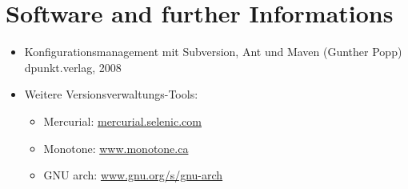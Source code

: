 \section{Software and further Informations}
\begin{itemize}
\item Konfigurationsmanagement mit Subversion,
  Ant und Maven (Gunther Popp) dpunkt.verlag, 2008
\label{lit:popp}
\item Weitere Versionsverwaltungs-Tools:
\begin{itemize}
\item Mercurial: \href{http://mercurial.selenic.com/}{mercurial.selenic.com}
\item Monotone:
  \href{http://www.monotone.ca}{www.monotone.ca}
\item GNU arch:
  \href{http://www.gnu.org/s/gnu-arch}{www.gnu.org/s/gnu-arch}
\end{itemize}
\end{itemize}

